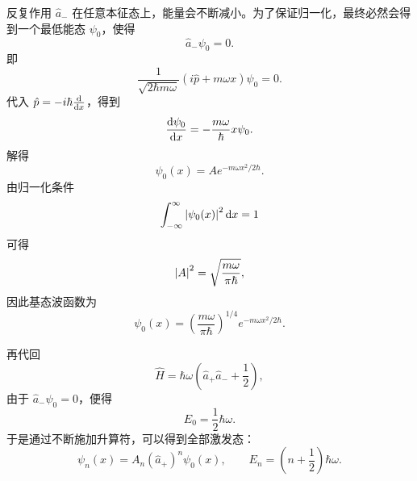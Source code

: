 反复作用 \(\hat{a}_-\) 在任意本征态上，能量会不断减小。为了保证归一化，最终必然会得到一个最低能态 \(\psi_0\)，使得
\begin{equation}
    \hat{a}_-\psi_0=0.
\end{equation}
即
\begin{equation}
    \frac{1}{\sqrt{2\hbar m\omega}}
    \left( i\hat{p}+m\omega x \right)\psi_0=0.
\end{equation}
代入 \(\hat{p}=-i\hbar \dv{x}\)，得到
\begin{equation}
    \dv{\psi_0}{x}=-\frac{m\omega}{\hbar}x\psi_0.
\end{equation}
解得
\begin{equation}
    \psi_0(x)=Ae^{-m\omega x^2/2\hbar}.
\end{equation}
由归一化条件
\begin{equation}
    \int_{-\infty}^{\infty}\abs{\psi_0(x)}^2\,\dd x=1
\end{equation}
可得
\begin{equation}
    \abs{A}^2=\sqrt{\frac{m\omega}{\pi\hbar}},
\end{equation}
因此基态波函数为
\begin{equation}
    \psi_0(x)=\left( \frac{m\omega}{\pi\hbar} \right)^{1/4}e^{-m\omega x^2/2\hbar}.
\end{equation}

再代回
\begin{equation}
    \hat{H}=\hbar\omega\left( \hat{a}_+\hat{a}_-+\frac{1}{2} \right),
\end{equation}
由于 \(\hat{a}_-\psi_0=0\)，便得
\begin{equation}
    E_0=\frac{1}{2}\hbar\omega.
\end{equation}
于是通过不断施加升算符，可以得到全部激发态：
\begin{equation}
    \psi_n(x)=A_n\left( \hat{a}_+ \right)^n\psi_0(x),
    \qquad
    E_n=\left( n+\frac{1}{2} \right)\hbar\omega.
\end{equation}

